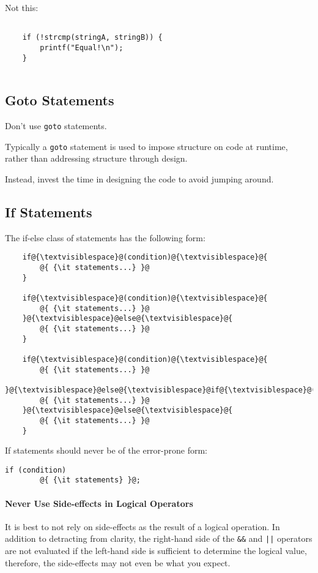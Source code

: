 \documentclass[fleqn,12pt]{PARCOneColumn} %
\begin{document}
Not this:

\begin{lstlisting}[backgroundcolor=\color{badCodeColor}]

    if (!strcmp(stringA, stringB)) {
        printf("Equal!\n");
    }
    
\end{lstlisting}

\subsection{Goto Statements}
Don't use {\tt goto} statements.

Typically a {\tt goto} statement is used to impose structure on code at runtime,
rather than addressing structure through design.

Instead, invest the time in designing the code to avoid jumping around.

\subsection{If Statements}
The if-else class of statements has the following form:

\begin{lstlisting}
    if@{\textvisiblespace}@(condition)@{\textvisiblespace}@{
        @{ {\it statements...} }@
    }

    if@{\textvisiblespace}@(condition)@{\textvisiblespace}@{
        @{ {\it statements...} }@
    }@{\textvisiblespace}@else@{\textvisiblespace}@{
        @{ {\it statements...} }@
    }

    if@{\textvisiblespace}@(condition)@{\textvisiblespace}@{
        @{ {\it statements...} }@
    }@{\textvisiblespace}@else@{\textvisiblespace}@if@{\textvisiblespace}@(condition)@{\textvisiblespace}@{
        @{ {\it statements...} }@
    }@{\textvisiblespace}@else@{\textvisiblespace}@{
        @{ {\it statements...} }@
    }
\end{lstlisting}

If statements should never be of the error-prone form:
\begin{lstlisting}[backgroundcolor=\color{badCodeColor}]
    if (condition) 
        @{ {\it statements} }@;
\end{lstlisting}

\paragraph{Never Use Side-effects in Logical Operators}
It is best to not rely on side-effects as the result of a logical operation. In addition to detracting from clarity, the right-hand side of the  {\tt \&\&} and {\tt ||} operators are not evaluated if the left-hand
side is sufficient to determine the logical value, therefore, the side-effects may not even be what you expect.
\end{document}
